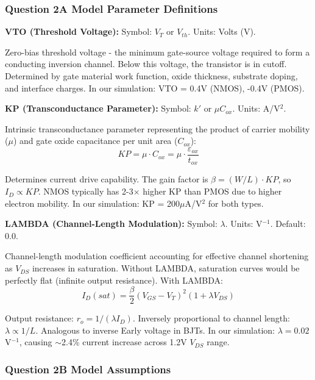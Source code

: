 \documentclass[a4paper,12pt]{article}
\begin{document}
\subsubsection{Question 2A\: Model Parameter Definitions}

\textbf{VTO (Threshold Voltage):}
Symbol: $V_T$ or $V_{th}$. Units: Volts (V).

Zero-bias threshold voltage - the minimum gate-source voltage required to form a conducting inversion channel. Below this voltage, the transistor is in cutoff. Determined by gate material work function, oxide thickness, substrate doping, and interface charges. In our simulation: VTO = 0.4V (NMOS), -0.4V (PMOS).

\textbf{KP (Transconductance Parameter):}
Symbol: $k'$ or $\mu C_{ox}$. Units: A/V$^2$.

Intrinsic transconductance parameter representing the product of carrier mobility ($\mu$) and gate oxide capacitance per unit area ($C_{ox}$):
\begin{equation}
KP = \mu \cdot C_{ox} = \mu \cdot \frac{\varepsilon_{ox}}{t_{ox}}
\end{equation}

Determines current drive capability. The gain factor is $\beta = (W/L) \cdot KP$, so $I_D \propto KP$. NMOS typically has 2-3$\times$ higher KP than PMOS due to higher electron mobility. In our simulation: KP = 200$\mu$A/V$^2$ for both types.

\textbf{LAMBDA (Channel-Length Modulation):}
Symbol: $\lambda$. Units: V$^{-1}$. Default: 0.0.

Channel-length modulation coefficient accounting for effective channel shortening as $V_{DS}$ increases in saturation. Without LAMBDA, saturation curves would be perfectly flat (infinite output resistance). With LAMBDA:
\begin{equation}
I_D(sat) = \frac{\beta}{2}(V_{GS} - V_T)^2(1 + \lambda V_{DS})
\end{equation}

Output resistance: $r_o = 1/(\lambda I_D)$. Inversely proportional to channel length: $\lambda \propto 1/L$. Analogous to inverse Early voltage in BJTs. In our simulation: $\lambda = 0.02$ V$^{-1}$, causing $\sim$2.4\% current increase across 1.2V $V_{DS}$ range.


\subsubsection{Question 2B\: Model Assumptions}
\end{document}
